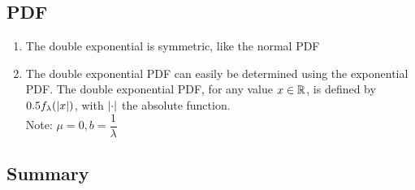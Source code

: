 \subsection{PDF}

\begin{enumerate}
    \item The double exponential is symmetric, like the normal PDF
    \hfill \cite{statistics/book/Statistics-for-Data-Scientists/Maurits-Kaptein}

    \item The double exponential PDF can easily be determined using the exponential PDF.
    The double exponential PDF, for any value $x \in \mathbb{R}$, is defined by $0.5 f_\lambda (\left| x \right|)$, with $\left| \cdot \right|$ the absolute function.
    \hfill \cite{statistics/book/Statistics-for-Data-Scientists/Maurits-Kaptein}
    \\
    Note: $\mu = 0, b=\dfrac{1}{\lambda}$
    \hfill \cite{common/online/chatgpt}
\end{enumerate}




\subsection{Summary}

